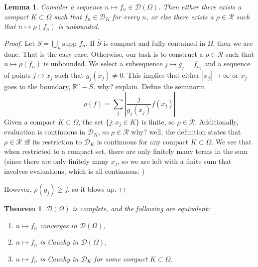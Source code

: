 \documentclass[letterpaper,twoside,11pt]{article}
\theoremstyle{mystyle}
\newtheorem{theorem}{Theorem}[section]
\newtheorem*{lemm}{Lemma}
\newcommand{\R}{{\mathbb R}}
\newcommand{\cg}{\color{gray}}
\newcommand{\cbk}{\color{black}}
\newcommand{\cred}{\color{red}}
\begin{document}
\begin{lemm}
  Consider a sequence $n \mapsto f_n \in \mathcal D(\Omega)$. Then either there exists a compact $K \subset \Omega$ such that $f_n \in \mathcal D_K $ for every $n$, or else there exists a $\rho \in \mathcal R$ such that $n \mapsto \rho(f_n)$ is unbounded. 
\end{lemm}
\begin{proof}
  Let $S = \bigcup_n \text{supp } f_n$. If $\overline S$ is compact and fully contained in $\Omega$, then we are done. That is the easy case. 
  Otherwise, our task is to construct a $\rho \in \mathcal R$ such that $n \mapsto \rho(f_n)$ is unbounded. We select a subsequence $j\mapsto g_j = f_{n_j}$ and a sequence of points $j \mapsto x_j$ such that $g_j(x_j) \neq 0$. This implies that either $|x_j|\to \infty$ or $x_j$ goes to the boundary, $\R^n -S$. \cred why? explain. \cbk Define the seminorm 
  \[\rho(f) = \sum_j \left\vert \frac{j}{g_j(x_j)} f(x_j) \right\vert \]
  Given a compact $K\subset \Omega$, the set $\{j : x_j \in K\}$ is finite, so $\rho \in \mathcal R$. Additionally, evaluation is continuous in $\mathcal D_K$, so $\rho \in \mathcal R$ \cg why? well, the definition states that $\rho\in \mathcal R$ iff its restriction to $\mathcal D_K$ is continuous for any compact $K\subset \Omega$. We see that when restricted to a compact set, there are only finitely many terms in the sum (since there are only finitely many $x_j$, so we are left with a finite sum that involves evaluations, which is all continuous. ) \cbk 
  
  However, $\rho(g_j) \geq j$, so it blows up. 
\end{proof}



\begin{tcolorbox}[colback=red!5!white,colframe=red!75!black]
\begin{theorem}
  $\mathcal D(\Omega)$ is complete, and the following are equivalent:
  \begin{enumerate}[label=(\alph*)]
    \item $n\mapsto f_n$ converges in $\mathcal D(\Omega)$, 
    \item $n \mapsto f_n$ is Cauchy in $\mathcal D(\Omega)$, 
    \item $n \mapsto f_n$ is Cauchy in $\mathcal D_K$ for some compact $K\subset \Omega$. 
  \end{enumerate}
\end{theorem}
\end{tcolorbox}
\end{document}

